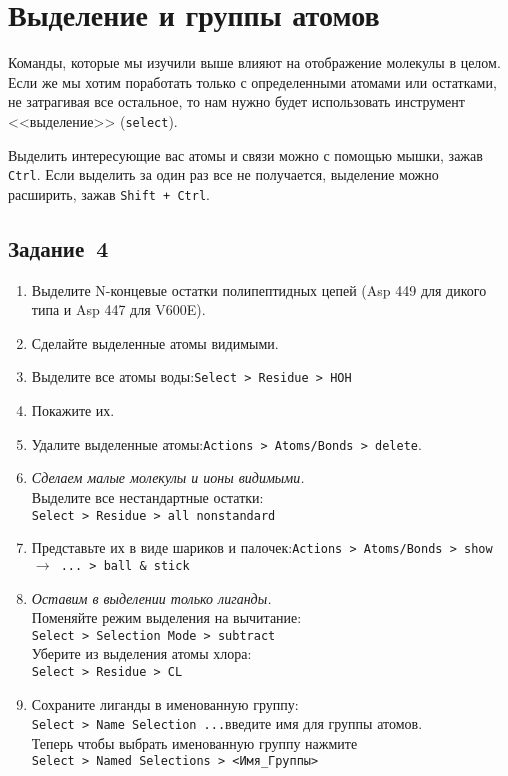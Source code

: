 \section{Выделение и группы атомов}
Команды, которые мы изучили выше влияют на отображение молекулы в целом. Если же мы хотим поработать только с определенными атомами или остатками, не затрагивая все остальное, то нам нужно будет использовать инструмент <<выделение>> (\texttt{select}).

Выделить интересующие вас атомы и связи можно с помощью мышки, зажав \texttt{Ctrl}. Если выделить за один раз все не получается, выделение можно расширить, зажав \texttt{Shift + Ctrl}.

\subsection*{Задание~4}
\begin{enumerate}
    \item Выделите N-концевые остатки полипептидных цепей (Asp 449 для дикого типа и Asp 447 для V600E).
    
    \item Сделайте выделенные атомы видимыми.
    
    \item Выделите все атомы воды:\quad\texttt{Select > Residue > HOH}\quad
    
    \item Покажите их.
    
    \item Удалите выделенные атомы:\quad\texttt{Actions > Atoms/Bonds > delete}.
    
    \item \textit{Сделаем малые молекулы и ионы видимыми.}\\
    Выделите все нестандартные остатки:\\\texttt{Select > Residue > all nonstandard}
    
    \item Представьте их в виде шариков и палочек:\quad\texttt{Actions > Atoms/Bonds > show $\rightarrow$ ... > ball \& stick}
    
    \item \textit{Оставим в выделении только лиганды.}\\
    Поменяйте режим выделения на вычитание:\\
    \texttt{Select > Selection Mode > subtract}\\
    Уберите из выделения атомы хлора:\\
    \texttt{Select > Residue > CL}
    
    \item Сохраните лиганды в именованную группу:\\
    \texttt{Select > Name Selection ...}\quad введите имя для группы атомов.\\
    Теперь чтобы выбрать именованную группу нажмите\\\texttt{Select > Named Selections > <Имя\_Группы>}
\end{enumerate}